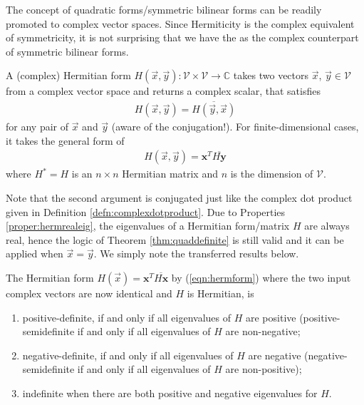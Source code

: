 The concept of quadratic forms/symmetric bilinear forms can be readily promoted to complex vector spaces. Since Hermiticity is the complex equivalent of symmetricity, it is not surprising that we have the  as the complex counterpart of symmetric bilinear forms.
\begin{defn}
A (complex) Hermitian form $H(\vec{x}, \vec{y}): \mathcal{V} \times \mathcal{V} \to \mathbb{C}$ takes two vectors $\vec{x}$, $\vec{y} \in \mathcal{V}$ from a complex vector space and returns a complex scalar, that satisfies 
\begin{align}
H(\vec{x}, \vec{y}) = \overline{H(\vec{y}, \vec{x})}
\end{align} for any pair of $\vec{x}$ and $\vec{y}$ (aware of the conjugation!). For finite-dimensional cases, it takes the general form of
\begin{align}
H(\vec{x}, \vec{y}) = \textbf{x}^T \overline{H \textbf{y}} \label{eqn:hermform}
\end{align}
where $H^* = H$ is an $n \times n$ Hermitian matrix and $n$ is the dimension of $\mathcal{V}$.
\end{defn}
Note that the second argument is conjugated just like the complex dot product given in Definition \ref{defn:complexdotproduct}. Due to Properties \ref{proper:hermrealeig}, the eigenvalues of a Hermitian form/matrix $H$ are always real, hence the logic of Theorem \ref{thm:quaddefinite} is still valid and it can be applied when $\vec{x} = \vec{y}$. We simply note the transferred results below.
\begin{thm}
\label{thm:hermdefinite}
The Hermitian form $H(\vec{x}) = \textbf{x}^T \overline{H\textbf{x}}$ by (\ref{eqn:hermform}) where the two input complex vectors are now identical and $H$ is Hermitian, is
\begin{enumerate}[label=(\alph*)]
\item positive-definite, if and only if all eigenvalues of $H$ are positive (positive-semidefinite if and only if all eigenvalues of $H$ are non-negative;
\item negative-definite, if and only if all eigenvalues of $H$ are negative (negative-semidefinite if and only if all eigenvalues of $H$ are non-positive); 
\item indefinite when there are both positive and negative eigenvalues for $H$.
\end{enumerate}
\end{thm}

